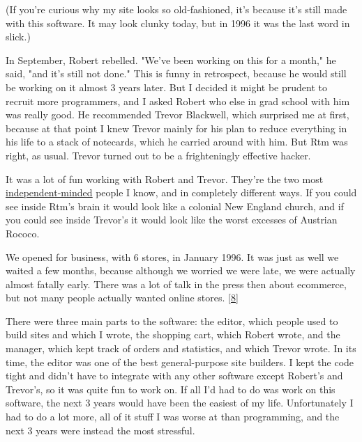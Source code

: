 (If you're curious why my site looks so
                  old-fashioned, it's because it's still made with this
                  software. It may look clunky today, but in 1996 it was the
                  last word in slick.)

In September, Robert rebelled.
                  "We've been working on this for a month," he said, "and it's
                  still not done." This is funny in retrospect, because he would
                  still be working on it almost 3 years later. But I decided it
                  might be prudent to recruit more programmers, and I asked
                  Robert who else in grad school with him was really good. He
                  recommended Trevor Blackwell, which surprised me at first,
                  because at that point I knew Trevor mainly for his plan to
                  reduce everything in his life to a stack of notecards, which
                  he carried around with him. But Rtm was right, as usual.
                  Trevor turned out to be a frighteningly effective hacker.

It
                  was a lot of fun working with Robert and Trevor. They're the
                  two most
                  \href{http://www.paulgraham.com/think.html}{\underline{independent-minded}} people I
                  know, and in completely different ways. If you could see
                  inside Rtm's brain it would look like a colonial New England
                  church, and if you could see inside Trevor's it would look
                  like the worst excesses of Austrian Rococo.

We
                  opened for business, with 6 stores, in January 1996. It was
                  just as well we waited a few months, because although we
                  worried we were late, we were actually almost fatally early.
                  There was a lot of talk in the press then about ecommerce, but
                  not many people actually wanted online stores.
                  [\href{\#f8n}{8}]

There were three main parts to the software: the
                  editor, which people used to build sites and which I wrote,
                  the shopping cart, which Robert wrote, and the manager, which
                  kept track of orders and statistics, and which Trevor wrote.
                  In its time, the editor was one of the best general-purpose
                  site builders. I kept the code tight and didn't have to
                  integrate with any other software except Robert's and
                  Trevor's, so it was quite fun to work on. If all I'd had to do
                  was work on this software, the next 3 years would have been
                  the easiest of my life. Unfortunately I had to do a lot more,
                  all of it stuff I was worse at than programming, and the next
                  3 years were instead the most stressful.

